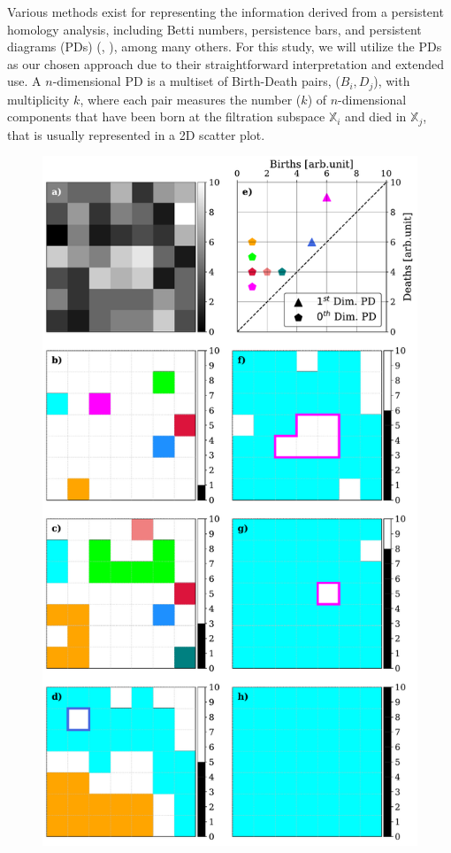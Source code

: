 Various methods exist for representing the information derived from a persistent homology analysis, including Betti numbers, persistence bars, and persistent diagrams (PDs) (\citealt{pd_stability}, \citealt{pbars}), among many others. For this study, we will utilize the PDs as our chosen approach due to their straightforward interpretation and extended use. A $n$-dimensional PD is a multiset of Birth-Death pairs, ($B _ i, D _ j$), with multiplicity $k$, where each pair measures the number ($k$) of $n$-dimensional components that have been born at the filtration subspace $\mathbb{X}_i$ and died in $\mathbb{X}_j$, that is usually represented in a 2D scatter plot. 

\begin{figure}
    \begin{minipage}[c]{0.67\textwidth}
      \includegraphics[width=\textwidth]{figures/PersistentHomology/ImageFiltering_example_v.pdf}

\end{minipage}
\end{figure}
